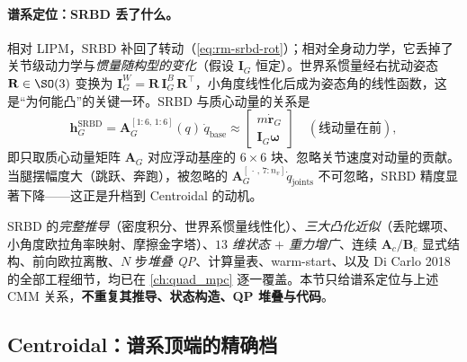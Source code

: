 \paragraph{谱系定位：SRBD 丢了什么。}
相对 LIPM，SRBD 补回了转动（\cref{eq:rm-srbd-rot}）；相对全身动力学，它丢掉了关节级动力学与\emph{惯量随构型的变化}（假设 $\mathbf{I}_G$ 恒定）。世界系惯量经右扰动姿态 $\mathbf{R}\in\SO(3)$ 变换为 $\mathbf{I}_G^W=\mathbf{R}\,\mathbf{I}_G^B\,\mathbf{R}^\top$，小角度线性化后成为姿态角的线性函数，这是“为何能凸”的关键一环。SRBD 与质心动量的关系是
\begin{equation}
  \mathbf{h}_G^{\mathrm{SRBD}}=\mathbf{A}_G^{[1:6,\,1:6]}(q)\,\dot{q}_{\mathrm{base}}
  \approx\begin{bmatrix}m\dot{\mathbf{r}}_G\\\mathbf{I}_G\boldsymbol{\omega}\end{bmatrix}
  \quad(\text{线动量在前}),
  \label{eq:rm-srbd-cmm}
\end{equation}
即只取质心动量矩阵 $\mathbf{A}_G$ 对应浮动基座的 $6\times 6$ 块、忽略关节速度对动量的贡献。当腿摆幅度大（跳跃、奔跑），被忽略的 $\mathbf{A}_G^{[\,\cdot\,,\,7:n_v]}\dot{q}_{\mathrm{joints}}$ 不可忽略，SRBD 精度显著下降——这正是升档到 Centroidal 的动机。

\begin{note}
SRBD 的\emph{完整推导}（密度积分、世界系惯量线性化）、\emph{三大凸化近似}（丢陀螺项、小角度欧拉角率映射、摩擦金字塔）、\emph{$13$ 维状态 $+$ 重力增广}、连续 $\mathbf{A}_c/\mathbf{B}_c$ 显式结构、前向欧拉离散、$N$ 步\emph{堆叠 QP}、计算量表、warm-start、以及 Di Carlo 2018 的全部工程细节，均已在 \cref{ch:quad_mpc} 逐一覆盖\cite{dicarlo2018cheetah}。本节只给谱系定位与上述 CMM 关系，\textbf{不重复其推导、状态构造、QP 堆叠与代码}。
\end{note}

\subsection{Centroidal：谱系顶端的精确档}
\label{subsec:rm-centroidal}

